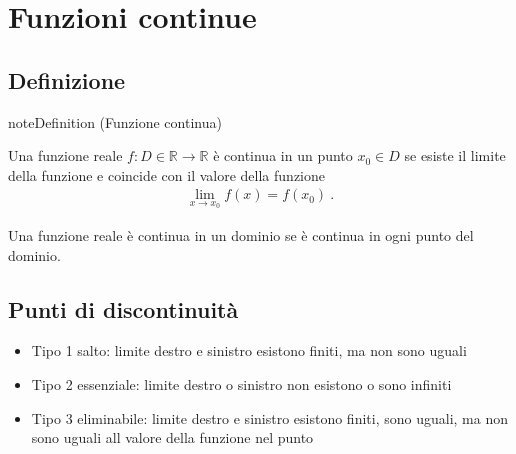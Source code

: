 \documentclass[letterpaper,10pt,italian]{jupyterBook}
\begin{document}
\section{Funzioni continue}
\label{\detokenize{ch/infinitesimal_calculus/analysis:funzioni-continue}}\label{\detokenize{ch/infinitesimal_calculus/analysis:infinitesimal-calculus-continuous-fun}}

\subsection{Definizione}
\label{\detokenize{ch/infinitesimal_calculus/analysis:definizione}}\label{\detokenize{ch/infinitesimal_calculus/analysis:infinitesimal-calculus-continuous-fun-def}}\label{None:definition-0}
\begin{sphinxadmonition}{note}{Definition  (Funzione continua)}



\sphinxAtStartPar
Una funzione reale \(f: D \in \mathbb{R} \rightarrow \mathbb{R}\) è continua in un punto \(x_0 \in D\)  se esiste il limite della funzione e coincide con il valore della funzione
\begin{equation*}
\begin{split}\lim_{x \rightarrow x_0} f(x) = f(x_0) \ .\end{split}
\end{equation*}\end{sphinxadmonition}

\sphinxAtStartPar
Una funzione reale è continua in un dominio  se è continua in ogni punto del dominio.


\subsection{Punti di discontinuità}
\label{\detokenize{ch/infinitesimal_calculus/analysis:punti-di-discontinuita}}\label{\detokenize{ch/infinitesimal_calculus/analysis:infinitesimal-calculus-continuous-fun-disc}}\begin{itemize}
\item {} 
\sphinxAtStartPar
Tipo 1 \sphinxhyphen{} salto: limite destro e sinistro esistono finiti, ma non sono uguali

\item {} 
\sphinxAtStartPar
Tipo 2 \sphinxhyphen{} essenziale: limite destro o sinistro non esistono o sono infiniti

\item {} 
\sphinxAtStartPar
Tipo 3 \sphinxhyphen{} eliminabile: limite destro e sinistro esistono finiti, sono uguali, ma non sono uguali all valore della funzione nel punto

\end{itemize}
\end{document}
